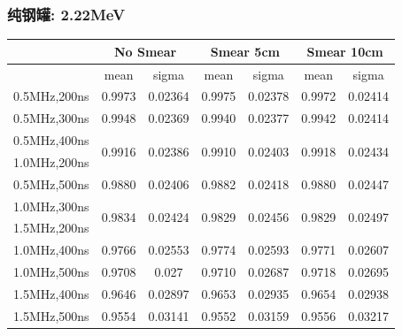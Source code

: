 \begin{frame}
    \frametitle{纯钢罐: 2.22MeV}

\begin{tabular}{|c|cc|cc|cc|}
\hline
 & \multicolumn{2}{|c|}{No Smear} 
 & \multicolumn{2}{|c|}{Smear 5cm}
 & \multicolumn{2}{|c|}{Smear 10cm}
\\
\hline
 & mean & sigma
 & mean & sigma
 & mean & sigma
\\
\hline
0.5MHz,200ns
 & 0.9973  & 0.02364
 & 0.9975  & 0.02378
 & 0.9972  & 0.02414
\\
\hline
0.5MHz,300ns
 & 0.9948  & 0.02369
 & 0.9940  & 0.02377
 & 0.9942  & 0.02414
\\
\hline
0.5MHz,400ns
& \multirow{2}{*}{0.9916} & \multirow{2}{*}{0.02386}
& \multirow{2}{*}{0.9910} & \multirow{2}{*}{0.02403}
& \multirow{2}{*}{0.9918} & \multirow{2}{*}{0.02434}
\\
\cline{1-1}
1.0MHz,200ns
 &  & 
 &  & 
 &  & 
\\
\hline
0.5MHz,500ns
 & 0.9880 &  0.02406
 & 0.9882 &  0.02418
 & 0.9880 &  0.02447
\\
\hline
1.0MHz,300ns
& \multirow{2}{*}{0.9834} & \multirow{2}{*}{0.02424}
& \multirow{2}{*}{0.9829} & \multirow{2}{*}{0.02456}
& \multirow{2}{*}{0.9829} & \multirow{2}{*}{0.02497}
\\
\cline{1-1}
1.5MHz,200ns
 &  & 
 &  & 
 &  & 
\\
\hline
1.0MHz,400ns
 & 0.9766 &  0.02553
 & 0.9774 &  0.02593
 & 0.9771 &  0.02607
\\
\hline
1.0MHz,500ns
 & 0.9708 &  0.027
 & 0.9710 &  0.02687
 & 0.9718 &  0.02695
\\
\hline
1.5MHz,400ns
 & 0.9646 &  0.02897
 & 0.9653 &  0.02935
 & 0.9654 &  0.02938
\\
\hline
1.5MHz,500ns
 & 0.9554 &  0.03141
 & 0.9552 &  0.03159
 & 0.9556 &  0.03217
\\
\hline
\end{tabular}

\end{frame}

